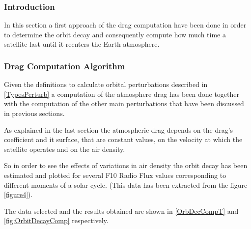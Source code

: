 \subsubsection{Introduction}

In this section a first approach of the drag computation have been done in order to determine the orbit decay and consequently compute how much time a satellite last until it reenters the Earth atmosphere.

\subsubsection{Drag Computation Algorithm}
Given the definitions to calculate orbital perturbations described in \ref{TypesPerturb} a computation of the atmosphere drag has been done together with the computation of the other main perturbations that have been discussed in previous sections.

As explained in the last section the atmospheric drag depends on the drag's coefficient and it surface, that are constant values, on the velocity at which the satellite operates and on the air density.

So in order to see the effects of variations in air density the orbit decay has been estimated and plotted for several F10 Radio Flux values corresponding to different moments of a solar cycle. (This data has been extracted from the figure \ref{figure4}).

The data selected and the results obtained are shown in \ref{OrbDecCompT} and \ref{fig:OrbitDecayComp} respectively.

